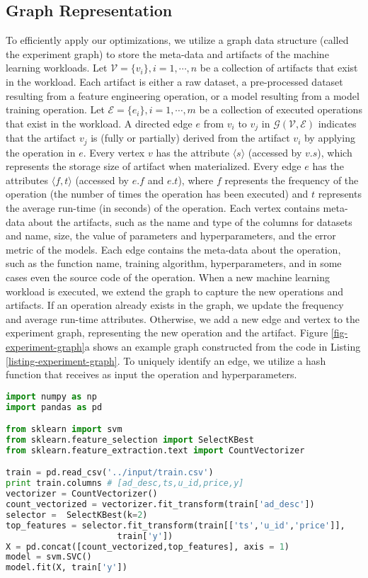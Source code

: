 \subsection{Graph Representation}\label{sub-graph-construction}
To efficiently apply our optimizations, we utilize a graph data structure (called the experiment graph) to store the meta-data and artifacts of the machine learning workloads.
Let $\mathcal{V}=\{v_i\}, i = 1, \cdots, n$ be a collection of artifacts that exist in the workload.
Each artifact is either a raw dataset, a pre-processed dataset resulting from a feature engineering operation, or a model resulting from a model training operation.
Let $\mathcal{E}=\{e_i\}, i = 1, \cdots, m$ be a collection of executed operations that exist in the workload.
A directed edge $e$ from $v_i$ to $v_j$ in $\mathcal{G}(\mathcal{V},\mathcal{E})$ indicates that the artifact $v_j$ is (fully or partially) derived from the artifact $v_i$ by applying the operation in $e$.
Every vertex $v$ has the attribute $\langle s \rangle$ (accessed by $v.s$), which represents the storage size of artifact when materialized.
Every edge $e$ has the attributes $\langle f, t\rangle$ (accessed by $e.f$ and $e.t$), where $f$ represents the frequency of the operation (the number of times the operation has been executed) and $t$ represents the average run-time (in seconds) of the operation.
Each vertex contains meta-data about the artifacts, such as the name and type of the columns for datasets and name, size, the value of parameters and hyperparameters, and the error metric of the models.
Each edge contains the meta-data about the operation, such as the function name, training algorithm, hyperparameters, and in some cases even the source code of the operation.
When a new machine learning workload is executed, we extend the graph to capture the new operations and artifacts.
If an operation already exists in the graph, we update the frequency and average run-time attributes.
Otherwise, we add a new edge and vertex to the experiment graph, representing the new operation and the artifact.
Figure \ref{fig-experiment-graph}a shows an example graph constructed from the code in Listing \ref{listing-experiment-graph}.
To uniquely identify an edge, we utilize a hash function that receives as input the operation and hyperparameters.

\begin{lstlisting}[language=Python, caption=Example script,captionpos=b,label = {listing-experiment-graph}]
import numpy as np
import pandas as pd

from sklearn import svm
from sklearn.feature_selection import SelectKBest
from sklearn.feature_extraction.text import CountVectorizer

train = pd.read_csv('../input/train.csv') 
print train.columns # [ad_desc,ts,u_id,price,y]
vectorizer = CountVectorizer()
count_vectorized = vectorizer.fit_transform(train['ad_desc'])
selector =  SelectKBest(k=2)
top_features = selector.fit_transform(train[['ts','u_id','price']], 
				      train['y'])
X = pd.concat([count_vectorized,top_features], axis = 1)
model = svm.SVC()
model.fit(X, train['y'])
\end{lstlisting}

